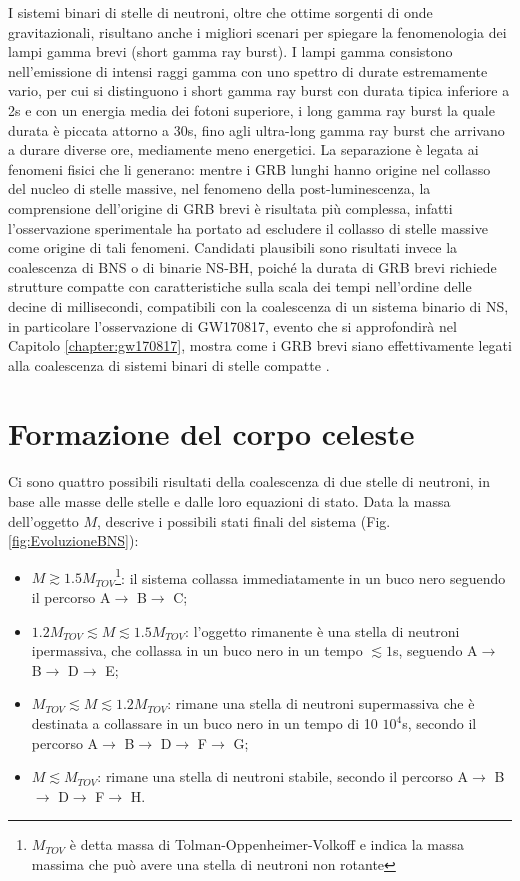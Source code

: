 I sistemi binari di stelle di neutroni, oltre che ottime sorgenti di onde gravitazionali, risultano anche i migliori scenari per spiegare la fenomenologia dei lampi gamma brevi (short gamma ray burst). I lampi gamma consistono nell'emissione di intensi raggi gamma con uno spettro di durate estremamente vario, per cui si distinguono i short gamma ray burst con durata tipica inferiore a 2s e con un energia media dei fotoni superiore, i long gamma ray burst la quale durata è piccata attorno a 30s, fino agli ultra-long gamma ray burst che arrivano a durare diverse ore, mediamente meno energetici. 
La separazione è legata ai fenomeni fisici che li generano: mentre i GRB lunghi hanno origine nel collasso del nucleo di stelle massive, nel fenomeno della post-luminescenza, la comprensione dell'origine di GRB brevi è risultata più complessa, infatti l'osservazione sperimentale ha portato ad escludere il collasso di stelle massive come origine di tali fenomeni. Candidati plausibili sono risultati invece la coalescenza di BNS o di binarie NS-BH, poiché la durata di GRB brevi richiede strutture compatte con caratteristiche sulla scala dei tempi nell'ordine delle decine di millisecondi, compatibili con la coalescenza di un sistema binario di NS, in particolare l'osservazione di GW170817, evento che si approfondirà nel Capitolo \ref{chapter:gw170817}, mostra come i GRB brevi siano effettivamente legati alla coalescenza di sistemi binari di stelle compatte \cite{maggiore2018gravitational}.
\section{Formazione del corpo celeste}
\label{section:residual}
Ci sono quattro possibili risultati della coalescenza di due stelle di neutroni, in base alle masse delle stelle e dalle loro equazioni di stato. 
Data la massa dell'oggetto $M$, \cite{sarin2020evolution} descrive i possibili stati finali del sistema (Fig.\ref{fig:EvoluzioneBNS}):
\begin{itemize}
	\item $M\gtrsim 1.5 M_{TOV}$\footnote{$M_{TOV}$ è detta massa di Tolman-Oppenheimer-Volkoff e indica la massa massima che può avere una stella di neutroni non rotante}: il sistema collassa immediatamente in un buco nero seguendo il percorso A$\rightarrow$ B$\rightarrow$ C;
\end{itemize}

\begin{itemize}
	\item $1.2 M_{TOV} \lesssim M \lesssim 1.5 M_{TOV}$: l'oggetto rimanente è una stella di neutroni ipermassiva, che collassa in un buco nero in un tempo $\lesssim 1$s, seguendo A$\rightarrow$ B$\rightarrow$ D$\rightarrow$ E;		
	\item $M_{TOV} \lesssim M \lesssim 1.2 M_{TOV}$: rimane una stella di neutroni supermassiva che è destinata a collassare in un buco nero in un tempo di 10 \textdiv $10^4$s, secondo il percorso A$\rightarrow$ B$\rightarrow$ D$\rightarrow$ F$\rightarrow$ G;		\item $M\lesssim M_{TOV}$: rimane una stella di neutroni stabile, secondo il percorso A$\rightarrow$ B$\rightarrow$ D$\rightarrow$ F$\rightarrow$ H.	
\end{itemize}

